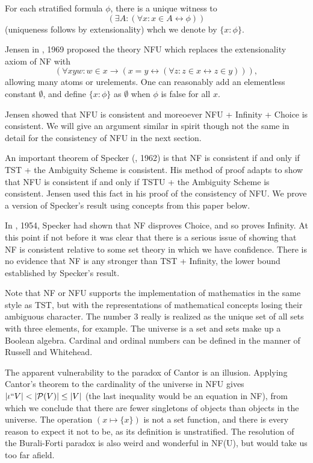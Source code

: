 \documentclass[112pt]{article}
\begin{document}
For each stratified formula $\phi$, there is a unique witness to $$(\exists A:(\forall x:x \in A \leftrightarrow \phi))$$ (uniqueness follows by extensionality) whch we denote by $\{x:\phi\}$.

Jensen in \cite{nfu}, 1969 proposed the theory NFU which replaces the extensionality axiom of NF with $$(\forall xyw:w \in x \rightarrow (x=y \leftrightarrow (\forall z:z \in x \leftrightarrow z\in y))),$$  allowing many atoms or urelements.  One can reasonably add an elementless constant $\emptyset$, and define $\{x:\phi\}$ as $\emptyset$ when $\phi$ is false for all $x$.

Jensen showed that NFU is consistent and moreoever NFU + Infinity + Choice is consistent.  We will give an argument similar in spirit though not the same in detail for the consistency of NFU in the next section.

An important theorem of Specker (\cite{ambiguity}, 1962) is that NF is consistent if and only if TST + the Ambiguity Scheme is consistent.  His method of proof adapts to show that  NFU is consistent if and only if TSTU + the Ambiguity Scheme is consistent.  Jensen used this fact in his proof of the consistency of NFU.  We prove a version of Specker's result using concepts from this paper below.

In \cite{notac}, 1954, Specker had shown that NF disproves Choice, and so proves Infinity.  At this point if not before it was clear that there is a serious issue of showing that NF is consistent relative to some set theory in which we have confidence.  There is no evidence that NF is any stronger than TST + Infinity, the lower bound established by Specker's result.

Note that NF or NFU supports the implementation of mathematics in the same style as TST, but with the representations of mathematical concepts losing their ambiguous character.  The number 3 really is realized as the unique set of all sets with three elements, for example.  The universe is a set and sets make up a Boolean algebra.   Cardinal and ordinal numbers can be defined
in the manner of Russell and Whitehead.

The apparent vulnerability to the paradox of Cantor is an illusion.  Applying Cantor's theorem to the cardinality of the universe in NFU gives $|\iota``V| < |{\cal P}(V)| \leq |V|$ (the last inequality would be an equation in NF), from which we conclude that there are fewer singletons of objects than objects in the universe.  The operation $(x \mapsto \{x\})$ is not a set function, and there is every reason to expect it not to be, as its definition is unstratified.  The resolution of the Burali-Forti paradox is also weird and wonderful in NF(U), but would take us too far afield.
\end{document}
